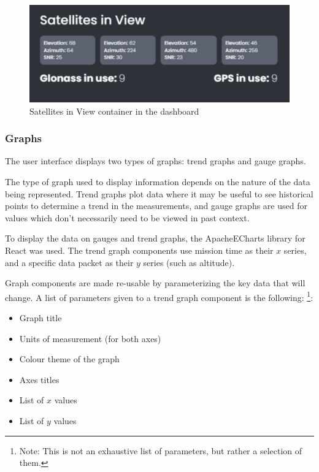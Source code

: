 \begin{figure}[H]
    \includegraphics [scale=0.8] {ui_satellites_in_view}
    \centering
     {Satellites in View container in the dashboard}
\end{figure}

\subsubsection{Graphs}
The user interface displays two types of graphs: trend graphs and gauge graphs.

The type of graph used to display information depends on the nature of the data being represented. Trend graphs 
plot data where it may be useful to see historical points to determine a trend in the measurements, and gauge graphs are 
used for values which don't necessarily need to be viewed in past context.

To display the data on gauges and trend graphs, the ApacheECharts library for React was used. The trend graph components use
mission time as their $x$ series, and a specific data packet as their $y$ series (such as altitude).

Graph components are made re-usable by parameterizing the key data that will change. A list of parameters given to a trend
graph component is the following:
\footnote{Note: This is not an exhaustive list of parameters, but rather a selection of them.}:

\begin{multicols}{2}
    \begin{itemize} 
        \item Graph title    
        \item Units of measurement (for both axes)       
        \item Colour theme of the graph
        \item Axes titles
        \item List of $x$ values
        \item List of $y$ values
    \end{itemize}
\end{multicols}

